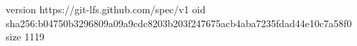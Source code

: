version https://git-lfs.github.com/spec/v1
oid sha256:b04750b3296809a09a9cdc8203b203f247675acb4aba7235fdad44e10c7a58f0
size 1119
